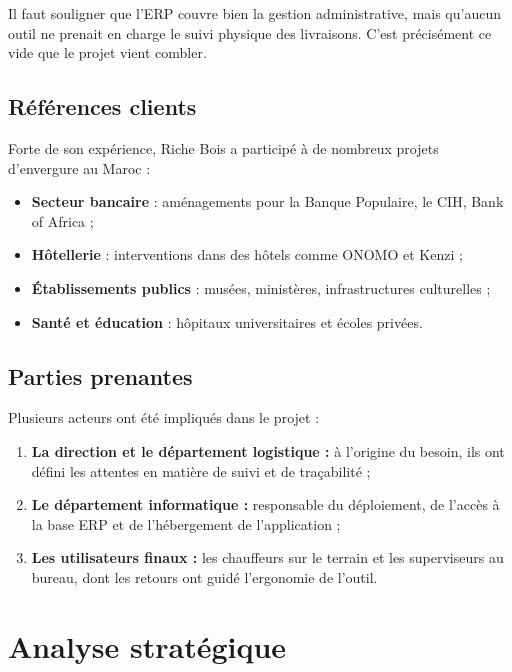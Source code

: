 \documentclass[12pt,a4paper]{report}
\begin{document}
Il faut souligner que l'ERP couvre bien la gestion administrative, mais qu'aucun outil ne prenait en charge le suivi physique des livraisons. C'est précisément ce vide que le projet vient combler.

\subsection{Références clients}

Forte de son expérience, Riche Bois a participé à de nombreux projets d'envergure au Maroc :

\begin{itemize}
\item \textbf{Secteur bancaire} : aménagements pour la Banque Populaire, le CIH, Bank of Africa ;
\item \textbf{Hôtellerie} : interventions dans des hôtels comme ONOMO et Kenzi ;
\item \textbf{Établissements publics} : musées, ministères, infrastructures culturelles ;
\item \textbf{Santé et éducation} : hôpitaux universitaires et écoles privées.
\end{itemize}

\subsection{Parties prenantes}

Plusieurs acteurs ont été impliqués dans le projet :

\begin{enumerate}
\item \textbf{La direction et le département logistique :} à l'origine du besoin, ils ont défini les attentes en matière de suivi et de traçabilité ;

\item \textbf{Le département informatique :} responsable du déploiement, de l'accès à la base ERP et de l'hébergement de l'application ;

\item \textbf{Les utilisateurs finaux :} les chauffeurs sur le terrain et les superviseurs au bureau, dont les retours ont guidé l'ergonomie de l'outil.
\end{enumerate}

\section{Analyse stratégique}
\end{document}
